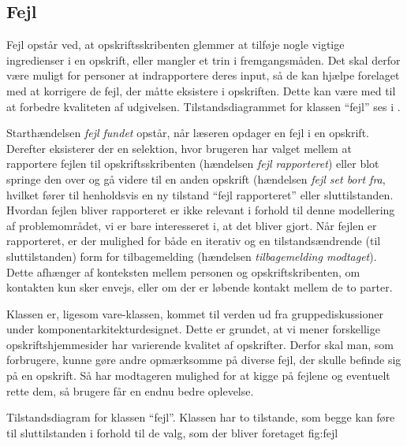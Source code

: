 \subsection{Fejl}
Fejl opstår ved, at opskriftsskribenten glemmer at tilføje nogle vigtige ingredienser i en opskrift, eller \fx mangler et trin i fremgangsmåden. Det skal derfor være muligt for personer at indrapportere deres input, så de kan hjælpe forelaget med at korrigere de fejl, der måtte eksistere i opskriften. Dette kan være med til at forbedre kvaliteten af udgivelsen. Tilstandsdiagrammet for klassen ``fejl'' ses i .

Starthændelsen \textit{fejl fundet} opstår, når læseren opdager en fejl i en opskrift. Derefter eksisterer der en selektion, hvor brugeren har valget mellem at rapportere fejlen til opskriftsskribenten (hændelsen \textit{fejl rapporteret}) eller blot springe den over og gå videre til en anden opskrift (hændelsen \textit{fejl set bort fra}, hvilket fører til henholdsvis en ny tilstand ``fejl rapporteret'' eller sluttilstanden. Hvordan fejlen bliver rapporteret er ikke relevant i forhold til denne modellering af problemområdet, vi er bare interesseret i, at det bliver gjort. Når fejlen er rapporteret, er der mulighed for både en iterativ og en tilstandsændrende (til sluttilstanden) form for tilbagemelding (hændelsen \textit{tilbagemelding modtaget}). Dette afhænger af konteksten mellem personen og opskriftskribenten, om kontakten kun sker envejs, eller om der er løbende kontakt mellem de to parter.

Klassen er, ligesom vare-klassen, kommet til verden ud fra gruppediskussioner under komponentarkitekturdesignet. Dette er grundet, at vi mener forskellige opskriftshjemmesider har varierende kvalitet af opskrifter. Derfor skal man, som forbrugere, kunne gøre andre opmærksomme på diverse fejl, der skulle befinde sig på en opskrift. Så har modtageren mulighed for at kigge på fejlene og eventuelt rette dem, så brugere får en endnu bedre oplevelse.

{Tilstandsdiagram for klassen ``fejl''. Klassen har to tilstande, som begge kan føre til sluttilstanden i forhold til de valg, som der bliver foretaget}
  {fig:fejl}


